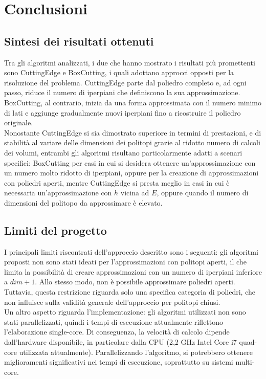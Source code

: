 \chapter{Conclusioni}

\section{Sintesi dei risultati ottenuti}
Tra gli algoritmi analizzati, i due che hanno mostrato i risultati più promettenti 
sono CuttingEdge e BoxCutting, i quali adottano approcci opposti per la risoluzione del problema. 
CuttingEdge parte dal poliedro completo e, ad ogni passo, riduce il numero di 
iperpiani che definiscono la sua approssimazione. BoxCutting, al contrario, 
inizia da una forma approssimata con il numero minimo di lati e aggiunge gradualmente 
nuovi iperpiani fino a ricostruire il poliedro originale.\\

Nonostante CuttingEdge si sia dimostrato superiore in termini di prestazioni, 
e di stabilità al variare delle dimensioni dei politopi 
grazie al ridotto numero di calcoli dei volumi, entrambi gli algoritmi 
risultano particolarmente adatti a scenari specifici:
BoxCutting per casi in cui si desidera ottenere un'approssimazione con 
un numero molto ridotto di iperpiani, oppure per la creazione di approssimazioni con poliedri aperti,
mentre CuttingEdge si presta meglio in casi in cui è necessaria un'approssimazione con $h$ vicina ad $E$,
oppure quando il numero di dimensioni del politopo da approssimare è elevato.

\section{Limiti del progetto}
I principali limiti riscontrati dell'approccio descritto sono i seguenti:
gli algoritmi proposti non sono stati ideati per l'approssimazioni con politopi aperti, 
il che limita la possibilità di creare approssimazioni con un numero di iperpiani 
inferiore a $dim + 1$. Allo stesso modo, non è possibile approssimare poliedri aperti. 
Tuttavia, questa restrizione riguarda solo una specifica categoria di poliedri, 
che non influisce sulla validità generale dell'approccio per politopi chiusi.\\

Un altro aspetto riguarda l'implementazione: gli algoritmi utilizzati non sono 
stati parallelizzati, quindi i tempi di esecuzione attualmente riflettono 
l'elaborazione single-core. Di conseguenza, la velocità di calcolo dipende 
dall'hardware disponibile, in particolare dalla CPU 
(2,2 GHz Intel Core i7 quad-core utilizzata attualmente). 
Parallelizzando l'algoritmo, si potrebbero ottenere miglioramenti significativi 
nei tempi di esecuzione, soprattutto su sistemi multi-core.\\

